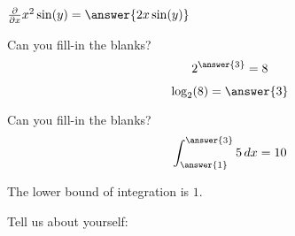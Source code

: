 \documentclass{ximera}
\begin{document}
\begin{problem}  
  $\frac{\partial}{\partial x} x^2\sin(y) =  \answer{2x\sin(y)}$  
\end{problem} 

\begin{problem}
  Can you fill-in the blanks?
  \[
  2^{\answer{3}} = 8
  \]
  \begin{problem}
    \[
    \log_2(8) = \answer{3}
    \]
  \end{problem}
\end{problem}

\begin{problem}
  Can you fill-in the blanks?
  \[
  \int_{\answer{1}}^{\answer{3}}5 \, d x = 10
  \]
  \begin{hint}
    The lower bound of integration is $1$.
  \end{hint}
\end{problem}



\begin{problem}
  Tell us about yourself:
  \begin{freeResponse}
  \end{freeResponse}
\end{problem}
\end{document}
